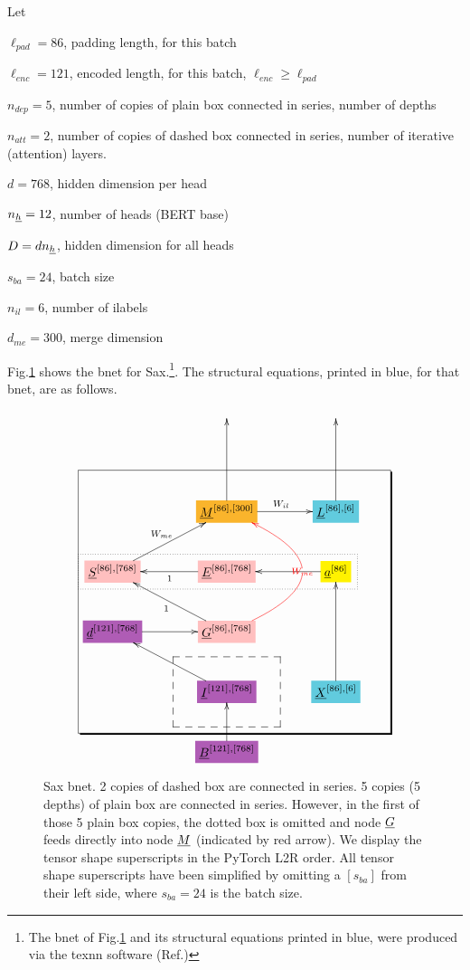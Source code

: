 Let

$\ell_{pad}=86$, padding length, for this batch

$\ell_{enc}=121$, encoded length, for this batch, $\ell_{enc}\geq \ell_{pad}$

$n_{dep}=5$, number of copies of plain box connected in series, number of depths

 $n_{att}=2$, number of copies of
dashed box connected in series, number of iterative (attention) layers.


$d=768$, hidden dimension per head

$n_{\underline{h}}=12$, number of heads (BERT base)

$D=d n_{\underline{h}}$, hidden dimension
for all heads


$s_{ba}=24$, batch size

$n_{il}=6$, number of ilabels

$d_{me}=300$, merge dimension

Fig.\ref{fig-texnn-for-sentence-ax-bnet}
shows the bnet  for Sax.\footnote{The
bnet of Fig.\ref{fig-texnn-for-sentence-ax-bnet}
and its structural equations
printed in blue,
were produced via the texnn software (Ref.\cite{texnn})}. The structural equations, printed in 
blue, for that bnet, are as follows.

\begin{figure}[h!]\centering
$$\xymatrix@R=2.5pc@C=3.5pc{
&&
\\
&&
\\
&*+[F*:Dandelion]{\underline{M}^{[86], [300]}}\ar[uu]\ar[r]^{W_{il}}&*+[F*:SkyBlue]{\underline{L}^{[86], [6]}}\ar[uu]
\\
*+[F*:pink]{\underline{S}^{[86], [768]}}\ar[ur]^{W_{me}}&*+[F*:pink]{\underline{E}^{[86], [768]}}\ar[l]^{1}&*+[F*:yellow]{\underline{a}^{[86]}}\ar[l]
\\
*+[F*:Orchid]{\underline{d}^{[121], [768]}}\ar[r]&*+[F*:pink]{\underline{G}^{[86], [768]}}\ar@[red]@/_5pc/[uu]|-{\color{red} W_{me}}\ar[ul]^{1}&
\\
&*+[F*:Orchid]{\underline{I}^{[121], [768]}}\ar[ul]&*+[F*:SkyBlue]{\underline{X}^{[86], [6]}}\ar[uu]
\\
&*+[F*:Orchid]{\underline{B}^{[121], [768]}}\ar[u]&
\save
\POS"3,1"."6,1"."3,3"."6,3"!C*+<4.8em>\frm{-,}
\POS"6,2"."6,2"."6,2"."6,2"!C*+<3.8em>\frm{--}
\POS"4,1"."4,1"."4,3"."4,3"!C*+<1.0em>\frm{.}
\restore
}$$
\caption{Sax bnet. 2 copies of dashed box are connected in series. 5 copies (5 depths) of plain box are connected in series.  However, in the first of those 5 plain box copies, the dotted box  is omitted and node $\underline{G}$ feeds directly into node  $\underline{M}$ (indicated by red arrow). We display the tensor shape superscripts in the PyTorch L2R order. All tensor shape superscripts have been simplified by omitting a $[s_{ba}]$ from their left side, where $s_{ba}=24$ is the batch size. }
\label{fig-texnn-for-sentence-ax-bnet}
\end{figure}

